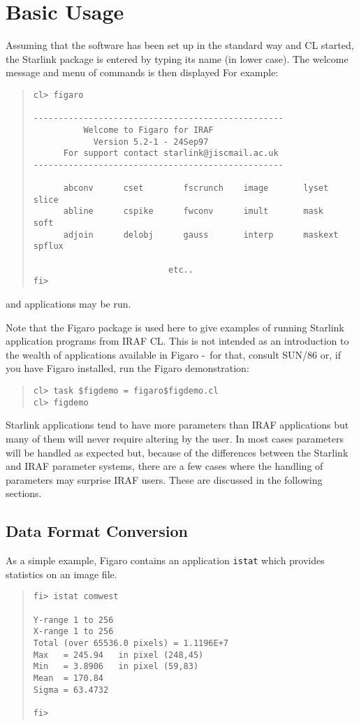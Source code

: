 \documentclass[twoside,11pt]{article}
\newcommand{\xref}[3]{#1}
\newcommand{\xlabel}[1]{}
\newcommand{\dash}{--}
\renewcommand{\dash}{-}
\begin{document}
\section{\xlabel{basic_usage}Basic Usage}
Assuming that the software has been set up in the standard way and CL started,
the Starlink package is entered by typing its name (in lower case). The welcome
message and menu of commands is then displayed
For example:
\begin{quote} \begin{verbatim}
cl> figaro

--------------------------------------------------
          Welcome to Figaro for IRAF
            Version 5.2-1 - 24Sep97
      For support contact starlink@jiscmail.ac.uk
--------------------------------------------------

      abconv      cset        fscrunch    image       lyset       slice
      abline      cspike      fwconv      imult       mask        soft
      adjoin      delobj      gauss       interp      maskext     spflux

                           etc..
fi>
\end{verbatim} \end{quote}
and applications may be run.

Note that the Figaro package is used here to give examples of running Starlink
application programs from IRAF CL. This is not intended as an introduction to
the wealth of applications available in Figaro \dash\ for that, consult
\xref{SUN/86}{sun86}{}
or, if you have Figaro installed, run the Figaro demonstration:
\begin{quote} \begin{verbatim}
cl> task $figdemo = figaro$figdemo.cl
cl> figdemo
\end{verbatim} \end{quote}

Starlink applications tend to have more parameters than IRAF applications but
many of them will never require altering by the user.
In most cases parameters will be handled as expected but, because of the
differences between the Starlink and IRAF parameter systems, there are a few
cases where the handling of parameters may surprise IRAF users.
These are discussed in the following sections.

\subsection{\xlabel{data_format_conversion}Data Format Conversion}
As a simple example, Figaro contains an application \texttt{istat} which
provides statistics on an image file.
\begin{quote} \begin{verbatim}
fi> istat comwest

Y-range 1 to 256
X-range 1 to 256
Total (over 65536.0 pixels) = 1.1196E+7
Max   = 245.94   in pixel (248,45)
Min   = 3.8906   in pixel (59,83)
Mean  = 170.84
Sigma = 63.4732

fi>
\end{verbatim} \end{quote}
\end{document}
